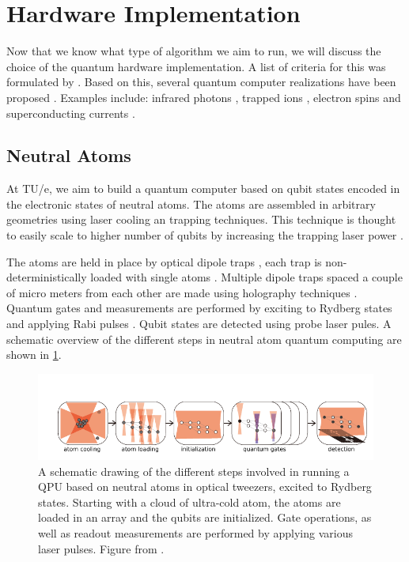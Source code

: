 \section{Hardware Implementation}

Now that we know what type of algorithm we aim to run, we will discuss the choice of the quantum hardware implementation. A list of criteria for this was formulated by \cite{DiVincenzo2000}. Based on this, several quantum computer realizations have been proposed \cite{Ladd2010}. Examples include: infrared photons \cite{Matthews2009},  trapped ions \cite{Benhelm2008,Schindler2013}, electron spins \cite{Press2008} and superconducting currents \cite{DiCarlo2009,Arute2019}. 

\subsection{Neutral Atoms}

At TU/e, we aim to build a quantum computer based on qubit states encoded in the electronic states of neutral atoms. The atoms are assembled in arbitrary geometries using laser cooling an trapping techniques. This technique is thought to easily scale to higher number of qubits by increasing the trapping laser power \cite{Henriet2020}. 

The atoms are held in place by optical dipole traps \cite{Chu1986}, each trap is non-deterministically loaded with single atoms \cite{Schlosser2001}. Multiple dipole traps spaced a couple of micro meters from each other are made using holography techniques \cite{Bergamini2004}. Quantum gates and measurements are performed by exciting to Rydberg states and applying Rabi pulses \cite{Levine2018,Madjarov2020}. Qubit states are detected using probe laser pules. A schematic overview of the different steps in neutral atom quantum computing are shown in \cref{fig:ComputingSteps}.

\begin{figure}
	\centering
	\includegraphics[width=\linewidth]{figures/ComputingSteps.pdf}
	\caption{A schematic drawing of the different steps involved in running a QPU based on neutral atoms in optical tweezers, excited to Rydberg states. Starting with a cloud of ultra-cold atom, the atoms are loaded in an array and the qubits are initialized. Gate operations, as well as readout measurements are performed by applying various laser pulses. Figure from \cite{Wu2021}.}
	\label{fig:ComputingSteps}
\end{figure}

